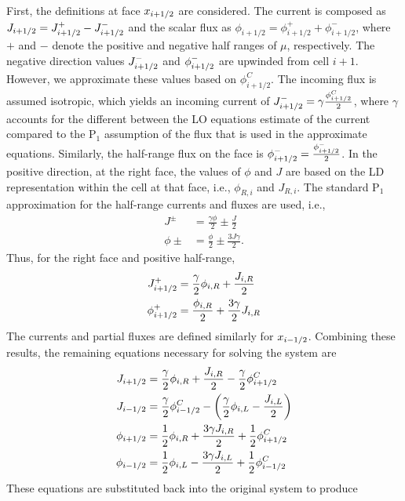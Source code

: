 First, the definitions at face ${x_{i+1/2}}$ are considered.  The current is composed as $J_{i+1/2} = J_{{i+1/2}}^+ - J_{{i+1/2}}^-$ and the scalar flux as $\phi_{i+1/2} =
\phi_{i+1/2}^+ + \phi_{i+1/2}^-$, where $+$ and $-$ denote the positive and negative
half ranges of $\mu$, respectively.  The negative direction values $J_{{i+1/2}}^-$ and
$\phi_{{i+1/2}}^-$ are upwinded from cell $i+1$. However, we approximate these values
based on $\phi_{i+1/2}^C$.  The incoming flux is assumed isotropic, which yields an
incoming current of $J^-_{{i+1/2}} = \gamma\frac{\phi_{{i+1/2}}^C}{2}$, where $\gamma$
accounts for the different between the LO equations estimate of the current compared
to the P$_1$ assumption of the flux that is used in the approximate equations.
Similarly, the half-range flux on the face is $\phi^-_{{i+1/2}} =
\frac{\phi_{{i+1/2}}^-}{2}$.   In the positive direction, at the right face, the
values of $\phi$ and $J$ are based on the LD representation within the cell at that
face, i.e., $\phi_{R,i}$ and $J_{R,i}$.  The standard P$_1$ approximation for the
half-range currents and fluxes are used\cite{stacy}, i.e.,
\begin{align}
    J^{\pm} &= \frac{\gamma \phi}{2} \pm \frac{J}{2} \\
    \phi{\pm} &= \frac{\phi}{2} \pm \frac{3J\gamma}{2}.
\end{align}
Thus, for the right face and positive half-range,
\begin{align}
    J_{{i+1/2}}^+ &= \frac{\gamma}{2}\phi_{i,R} + \frac{J_{i,R}}{2} \\
    \phi_{{i+1/2}}^+  &= \frac{\phi_{i,R}}{2} + \frac{3\gamma}{2} J_{i,R}
\end{align}
The currents and partial fluxes are defined similarly for ${x_{i-1/2}}$.  Combining these
results, the remaining equations necessary for solving the system are
\begin{align}
    J_{i+1/2} &= \frac{\gamma}{2}\phi_{i,R} + \frac{J_{i,R}}{2} -
    \frac{\gamma}{2}\phi_{{i+1/2}}^C \\
    J_{i-1/2} &= \frac{\gamma}{2}\phi_{{i-1/2}}^C - \left(\frac{\gamma}{2}\phi_{i,L} -
    \frac{J_{i,L}}{2}\right) \\
    \phi_{i+1/2} &= \frac{1}{2}\phi_{i,R} + \frac{3\gamma J_{i,R}}{2} +
    \frac{1}{2}\phi_{{i+1/2}}^C  \\
    \phi_{i-1/2} &= \frac{1}{2}\phi_{i,L} - \frac{3\gamma J_{i,L}}{2} +
    \frac{1}{2}\phi_{{i-1/2}}^C  
\end{align}
These equations are substituted back into the original system to produce
